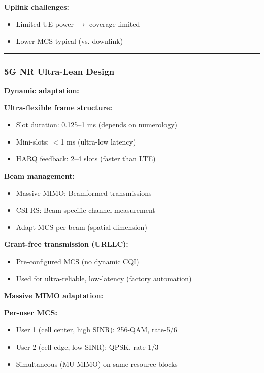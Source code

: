 \textbf{Uplink challenges:}
\begin{itemize}
\item Limited UE power $\rightarrow$ coverage-limited
\item Lower MCS typical (vs. downlink)
\end{itemize}

\begin{center}\rule{0.5\linewidth}{0.5pt}\end{center}

\subsubsection{5G NR Ultra-Lean Design}\label{g-nr-ultra-lean-design}

\textbf{Dynamic adaptation:}

\textbf{Ultra-flexible frame structure:}
\begin{itemize}
\item Slot duration: 0.125--1 ms (depends on numerology)
\item Mini-slots: $<$1 ms (ultra-low latency)
\item HARQ feedback: 2--4 slots (faster than LTE)
\end{itemize}

\textbf{Beam management:}
\begin{itemize}
\item Massive MIMO: Beamformed transmissions
\item CSI-RS: Beam-specific channel measurement
\item Adapt MCS per beam (spatial dimension)
\end{itemize}

\textbf{Grant-free transmission (URLLC):}
\begin{itemize}
\item Pre-configured MCS (no dynamic CQI)
\item Used for ultra-reliable, low-latency (factory automation)
\end{itemize}

\textbf{Massive MIMO adaptation:}

\textbf{Per-user MCS:}
\begin{itemize}
\item User 1 (cell center, high SINR): 256-QAM, rate-5/6
\item User 2 (cell edge, low SINR): QPSK, rate-1/3
\item Simultaneous (MU-MIMO) on same resource blocks
\end{itemize}

